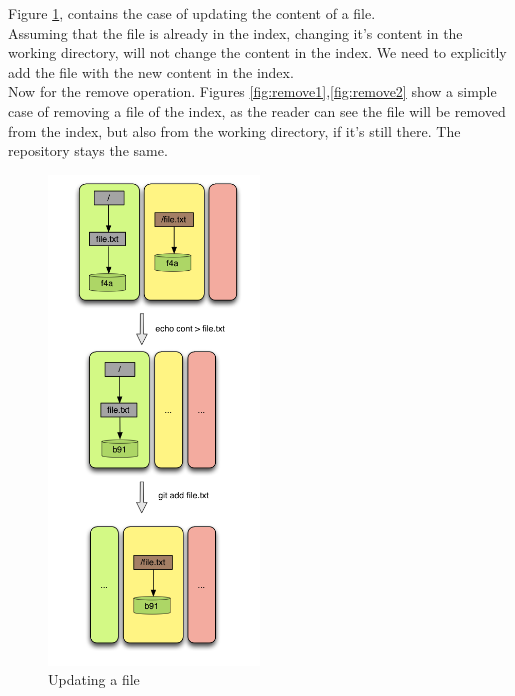Figure \ref{fig:update1}, contains the case of updating the content of a file.
\\
Assuming that the file is already in the index, changing it's content in the 
working directory, will not change the content in the index. We need to 
explicitly add the file with the new content in the index. \\ 

Now for the remove operation. Figures \ref{fig:remove1},\ref{fig:remove2} 
show a simple case of
removing a file of the index, as the reader can see the file will be
removed from the index, but also from the working directory, if it's still
there. The repository stays the same.

\begin{figure}[!h]
   \centering
   \includegraphics[width=0.5\textwidth]{images/update1.png}
   \caption{Updating a file}\label{fig:update1}
\end{figure}

